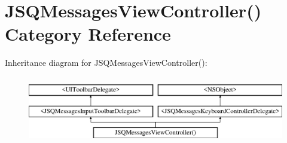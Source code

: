 \hypertarget{category_j_s_q_messages_view_controller_07_08}{}\section{J\+S\+Q\+Messages\+View\+Controller() Category Reference}
\label{category_j_s_q_messages_view_controller_07_08}
Inheritance diagram for J\+S\+Q\+Messages\+View\+Controller()\+:\begin{figure}[H]
\begin{center}
\leavevmode
\includegraphics[height=3.000000cm]{category_j_s_q_messages_view_controller_07_08}
\end{center}
\end{figure}
